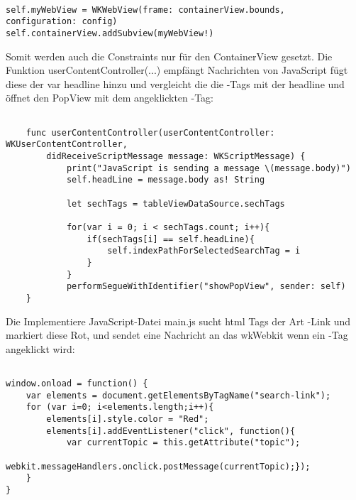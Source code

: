 \begin{verbatim}

self.myWebView = WKWebView(frame: containerView.bounds,
configuration: config)
self.containerView.addSubview(myWebView!)
\end{verbatim}
Somit werden auch die Constraints nur für den ContainerView gesetzt.
Die Funktion userContentController(...) empfängt Nachrichten von JavaScript fügt diese der var headline hinzu und vergleicht die die \SEARCH-Tags mit der headline und öffnet den PopView mit dem angeklickten \SEARCH-Tag:
\begin{verbatim}

    func userContentController(userContentController: WKUserContentController,
        didReceiveScriptMessage message: WKScriptMessage) {
            print("JavaScript is sending a message \(message.body)")
            self.headLine = message.body as! String
            
            let sechTags = tableViewDataSource.sechTags
            
            for(var i = 0; i < sechTags.count; i++){
                if(sechTags[i] == self.headLine){
                    self.indexPathForSelectedSearchTag = i
                }
            }            
            performSegueWithIdentifier("showPopView", sender: self)
    }
\end{verbatim}
Die Implementiere JavaScript-Datei main.js sucht html Tags der Art \SEARCH-Link und markiert diese Rot, und sendet eine Nachricht an das wkWebkit wenn ein \SEARCH-Tag angeklickt wird:
\begin{verbatim}

window.onload = function() {    
    var elements = document.getElementsByTagName("search-link");
    for (var i=0; i<elements.length;i++){
        elements[i].style.color = "Red";
        elements[i].addEventListener("click", function(){
            var currentTopic = this.getAttribute("topic");
            webkit.messageHandlers.onclick.postMessage(currentTopic);});
    }
}
\end{verbatim}

